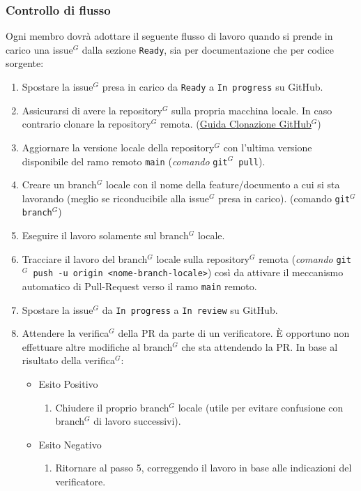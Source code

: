 \documentclass[a4paper,10pt]{article}
\begin{document}
\subsubsection{Controllo di flusso}
Ogni membro dovrà adottare il seguente flusso di lavoro quando si prende in carico una issue$^G$ dalla sezione \texttt{Ready},
sia per documentazione che per codice sorgente:
\begin{enumerate}
  \item Spostare la issue$^G$ presa in carico da \texttt{Ready} a \texttt{In progress} su GitHub.
  \item Assicurarsi di avere la repository$^G$ sulla propria macchina locale. In caso contrario clonare la repository$^G$ remota. 
  (\href{https://docs.github.com/en/repositories/creating-and-managing-repositories/cloning-a-repository}{\underline{Guida Clonazione GitHub$^G$}})  
  \item Aggiornare la versione locale della repository$^G$ con l'ultima versione disponibile del ramo remoto \texttt{main} (\textit{comando} \texttt{git$^G$ pull}).
  \item Creare un branch$^G$ locale con il nome della feature/documento a cui si sta lavorando (meglio se riconducibile alla issue$^G$ presa in carico). 
    (comando \texttt{git$^G$ branch$^G$})
  \item Eseguire il lavoro solamente sul branch$^G$ locale. 
  \item Tracciare il lavoro del branch$^G$ locale sulla repository$^G$ remota (\textit{comando} \texttt{git$^G$ push -u origin <nome-branch-locale>}) così da attivare il meccanismo
    automatico di Pull-Request verso il ramo \texttt{main} remoto.
  \item Spostare la issue$^G$ da \texttt{In progress} a \texttt{In review} su GitHub. 
  \item Attendere la verifica$^G$ della PR da parte di un verificatore. È opportuno non effettuare altre modifiche al branch$^G$ che sta attendendo la PR.
    In base al risultato della verifica$^G$:
    \begin{itemize}
      \item Esito Positivo
        \begin{enumerate}
          \item Chiudere il proprio branch$^G$ locale (utile per evitare confusione con branch$^G$ di lavoro successivi).
        \end{enumerate}
      \item Esito Negativo
        \begin{enumerate}
          \item Ritornare al passo 5, correggendo il lavoro in base alle indicazioni del verificatore.
        \end{enumerate}
    \end{itemize}
\end{enumerate}
\end{document}
